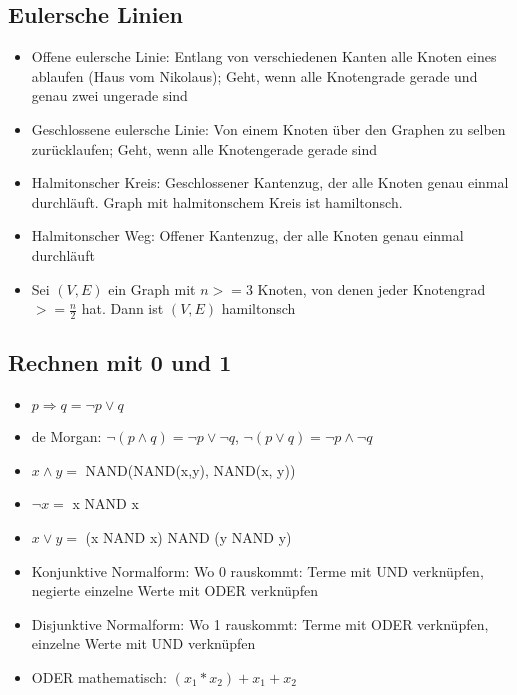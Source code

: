 \documentclass[12pt,landscape]{article}
\begin{document}
\begin{multicols}{3}
\subsection{Eulersche Linien}
\begin{itemize}
\item Offene eulersche Linie: Entlang von verschiedenen Kanten alle Knoten eines ablaufen (Haus vom Nikolaus); Geht, wenn alle Knotengrade gerade und genau zwei ungerade sind
\item Geschlossene eulersche Linie: Von einem Knoten über den Graphen zu selben zurücklaufen; Geht, wenn alle Knotengerade gerade sind
\item Halmitonscher Kreis: Geschlossener Kantenzug, der alle Knoten genau einmal durchläuft. Graph mit halmitonschem Kreis ist hamiltonsch.
\item Halmitonscher Weg: Offener Kantenzug, der alle Knoten genau einmal durchläuft
\item Sei $(V, E)$ ein Graph mit $n >= 3$ Knoten, von denen jeder Knotengrad $>= \frac{n}{2}$ hat. Dann ist $(V, E)$ hamiltonsch
\end{itemize}
\subsection{Rechnen mit 0 und 1}
\begin{itemize}
\item $p \Rightarrow q = \neg p \vee q$
\item de Morgan: $\neg (p \wedge q)  = \neg p \vee \neg q$, $\neg (p \vee q)  = \neg p \wedge \neg q$
\item $x \wedge y =$ NAND(NAND(x,y), NAND(x, y))
\item $\neg x =$ x NAND x
\item $x \vee y =$ (x NAND x) NAND (y NAND y)
\item Konjunktive Normalform: Wo 0 rauskommt: Terme mit UND verknüpfen, negierte einzelne Werte mit ODER verknüpfen
\item Disjunktive Normalform: Wo 1 rauskommt: Terme mit ODER verknüpfen, einzelne Werte mit UND verknüpfen
\item ODER mathematisch: $(x_1 * x_2) + x_1 + x_2$
\end{itemize}

\end{multicols}
\end{document}
